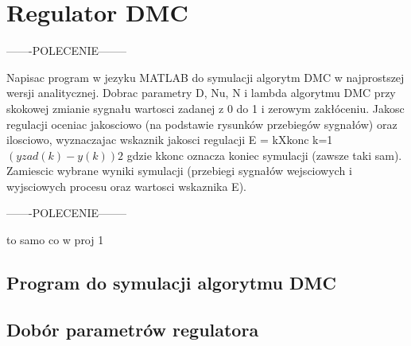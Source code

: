 \section{Regulator DMC}

-------POLECENIE--------

Napisac program w jezyku MATLAB do symulacji algorytm DMC w najprostszej
wersji analitycznej. Dobrac parametry D, Nu, N i lambda algorytmu DMC przy skokowej
zmianie sygnału wartosci zadanej z 0 do 1 i zerowym zakłóceniu. Jakosc regulacji
oceniac jakosciowo (na podstawie rysunków przebiegów sygnałów) oraz ilosciowo, wyznaczajac
wskaznik jakosci regulacji
E =
kXkonc
k=1
$(yzad(k) - y(k))2$
gdzie kkonc oznacza koniec symulacji (zawsze taki sam). Zamiescic wybrane wyniki
symulacji (przebiegi sygnałów wejsciowych i wyjsciowych procesu oraz wartosci wskaznika
E).

-------POLECENIE--------

to samo co w proj 1

\subsection{Program do symulacji algorytmu DMC}

\subsection{Dobór parametrów regulatora}

